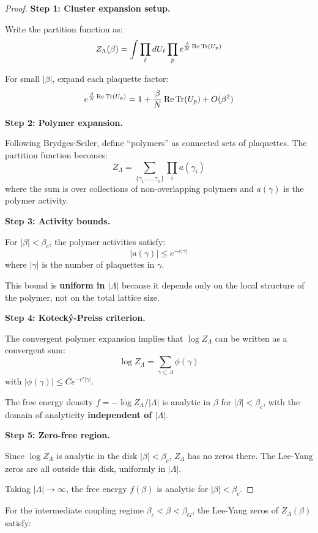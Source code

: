 \begin{remark}
\begin{proof}
\textbf{Step 1: Cluster expansion setup.}

Write the partition function as:
\[
Z_\Lambda(\beta) = \int \prod_\ell dU_\ell \prod_p e^{\frac{\beta}{N}\operatorname{Re}\operatorname{Tr}(U_p)}
\]

For small $|\beta|$, expand each plaquette factor:
\[
e^{\frac{\beta}{N}\operatorname{Re}\operatorname{Tr}(U_p)} = 1 + \frac{\beta}{N}\operatorname{Re}\operatorname{Tr}(U_p) + O(\beta^2)
\]

\textbf{Step 2: Polymer expansion.}

Following Brydges-Seiler, define ``polymers'' as connected sets of plaquettes. 
The partition function becomes:
\[
Z_\Lambda = \sum_{\{\gamma_1, \ldots, \gamma_n\}} \prod_i a(\gamma_i)
\]
where the sum is over collections of non-overlapping polymers and 
$a(\gamma)$ is the polymer activity.

\textbf{Step 3: Activity bounds.}

For $|\beta| < \beta_c$, the polymer activities satisfy:
\[
|a(\gamma)| \leq e^{-c|\gamma|}
\]
where $|\gamma|$ is the number of plaquettes in $\gamma$.

This bound is \textbf{uniform in $|\Lambda|$} because it depends only on 
the local structure of the polymer, not on the total lattice size.

\textbf{Step 4: Koteck\'y-Preiss criterion.}

The convergent polymer expansion implies that $\log Z_\Lambda$ can be written as 
a convergent sum:
\[
\log Z_\Lambda = \sum_{\gamma \subset \Lambda} \phi(\gamma)
\]
with $|\phi(\gamma)| \leq C e^{-c'|\gamma|}$.

The free energy density $f = -\log Z_\Lambda / |\Lambda|$ is analytic in $\beta$ 
for $|\beta| < \beta_c$, with the domain of analyticity \textbf{independent of $|\Lambda|$}.

\textbf{Step 5: Zero-free region.}

Since $\log Z_\Lambda$ is analytic in the disk $|\beta| < \beta_c$, $Z_\Lambda$ 
has no zeros there. The Lee-Yang zeros are all outside this disk, uniformly in $|\Lambda|$.

Taking $|\Lambda| \to \infty$, the free energy $f(\beta)$ is analytic for $|\beta| < \beta_c$.
\end{proof}

\begin{proposition}
\label{prop:lee-yang-intermediate}
For the intermediate coupling regime $\beta_c < \beta < \beta_G$, the Lee-Yang 
zeros of $Z_\Lambda(\beta)$ satisfy:


\end{proposition}
\end{remark}

